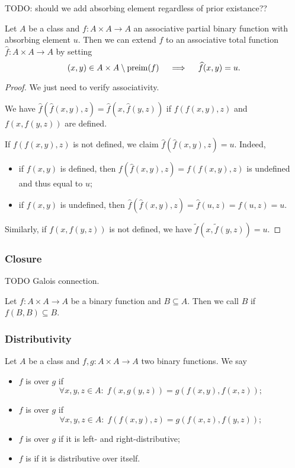 TODO: should we add absorbing element regardless of prior existance??

\begin{lemma}
Let $A$ be a class and $f: A\times A \to A$ an associative partial binary function with absorbing element $u$. Then we can extend $f$ to an associative total function $\widehat{f}: A \times A \to A$
by setting
\[ (x,y) \in A\times A \setminus \operatorname{preim}(f) \quad\implies\quad \widehat{f}(x,y) = u. \]
\end{lemma}
\begin{proof}
We just need to verify associativity.

We have $\widehat{f}(\widehat{f}(x,y),z) = \widehat{f}(x,\widehat{f}(y,z))$ if $f(f(x,y),z)$ and $f(x,f(y,z))$ are defined.

If $f(f(x,y),z)$ is not defined, we claim $\widehat{f}(\widehat{f}(x,y),z) = u$. Indeed,
\begin{itemize}
\item if $f(x,y)$ is defined, then $f(\widehat{f}(x,y),z) = f(f(x,y),z)$ is undefined and thus equal to $u$;
\item if $f(x,y)$ is undefined, then $\widehat{f}(\widehat{f}(x,y),z) = \widehat{f}(u,z) = f(u,z) = u$.
\end{itemize}

Similarly, if $f(x, f(y, z))$ is not defined, we have $\widetilde{f}(x, \widetilde{f}(y, z)) = u$.
\end{proof}

\subsubsection{Closure}
TODO Galois connection.
\begin{definition}
Let $f:A\times A\to A$ be a binary function and $B\subseteq A$. Then we call $B$  if $f(B,B) \subseteq B$.
\end{definition}

\subsubsection{Distributivity}
\begin{definition}
Let $A$ be a class and $f,g: A\times A \to A$ two binary functions. We say
\begin{itemize}
\item $f$ is  over $g$ if
\[ \forall x,y,z\in A: \; f(x,g(y,z)) = g(f(x,y),f(x,z)); \]
\item $f$ is  over $g$ if
\[ \forall x,y,z\in A: \; f(f(x,y), z) = g(f(x,z),f(y,z)); \]
\item $f$ is  over $g$ if it is left- and right-distributive;
\item $f$ is  if it is distributive over itself.
\end{itemize}
\end{definition}

